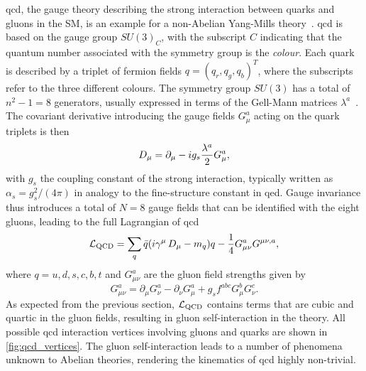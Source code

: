 \gls{qcd}, the gauge theory describing the strong interaction between quarks and gluons in the SM, is an example for a non-Abelian Yang-Mills theory~\cite{PhysRev.96.191}. \gls{qcd} is based on the gauge group $SU(3)_C$, with the subscript $C$ indicating that the quantum number associated with the symmetry group is the \textit{colour}. Each quark is described by a triplet of fermion fields $q = (q_r,q_g,q_b)^T$, where the subscripts refer to the three different colours. The symmetry group $SU(3)$ has a total of $n^2-1 = 8$ generators, usually expressed in terms of the Gell-Mann matrices $\lambda^a$~\cite{Peskin:1995ev}. The covariant derivative introducing the gauge fields $G_\mu^a$ acting on the quark triplets is then
\begin{equation}
	\mathop{}\!D_\mu = \partial_\mu - ig_s \frac{\lambda^a}{2	}G_\mu^a,
\end{equation}
with $g_s$ the coupling constant of the strong interaction, typically written as $\alpha_s = g_s^2 / (4\pi)$ in analogy to the fine-structure constant in \gls{qed}. Gauge invariance thus introduces a total of $N=8$ gauge fields that can be identified with the eight gluons, leading to the full Lagrangian of \gls{qcd}
\begin{equation}
	\mathcal{L}_\mathrm{QCD} = \sum_q{\bar{q}(i\gamma^\mu\mathop{}\!D_\mu - m_q)q} - \frac{1}{4}G^a_{\mu\nu}G^{\mu\nu,a},
\end{equation}
where $q = u,d,s,c,b,t$ and $G^a_{\mu\nu}$ are the gluon field strengths given by
\begin{equation}
	G^a_{\mu\nu} = \partial_\mu G^a_\nu - \partial_\nu G^a_\mu + g_s f^{abc}G^b_\mu G^c_\nu.
\end{equation}
As expected from the previous section, $\mathcal{L}_\mathrm{QCD}$ contains terms that are cubic and quartic in the gluon fields, resulting in gluon self-interaction in the theory. All possible \gls{qcd} interaction vertices involving gluons and quarks are shown in \cref{fig:qcd_vertices}. The gluon self-interaction leads to a number of phenomena unknown to Abelian theories, rendering the kinematics of \gls{qcd} highly non-trivial.

